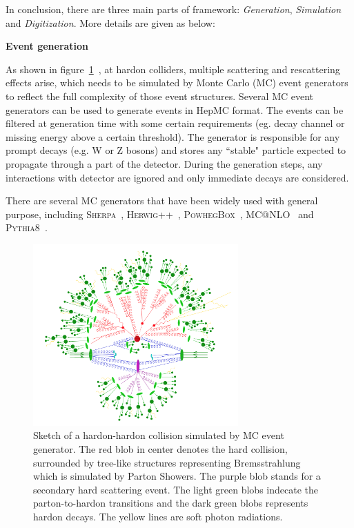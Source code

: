 In conclusion, there are three main parts of framework: \textit{Generation}, \textit{Simulation} and \textit{Digitization}.
More details are given as below:

\textbf{Event generation}

As shown in figure~\ref{fig:mc_event_structure}~\cite{Hoche:2014rga}, at hardon colliders, multiple scattering and rescattering effects arise, which needs to be simulated by Monte Carlo (MC) event generators to reflect the full complexity of those event structures.
Several MC event generators can be used to generate events in HepMC format.
The events can be filtered at generation time with some certain requirements (eg. decay channel or missing energy above a certain threshold).
The generator is responsible for any prompt decays (e.g. W or Z bosons) and stores any ``stable" particle expected to propagate through a part of the detector. 
During the generation steps, any interactions with detector are ignored and only immediate decays are considered.

There are several MC generators that have been widely used with general purpose, including \textsc{Sherpa}~\cite{Gleisberg_2009}, \textsc{Herwig++}~\cite{Bahr2008}, \textsc{PowhegBox}~\cite{Nason:2004rx}, \textsc{MC@NLO}~\cite{Frixione_2002} and \textsc{Pythia8}~\cite{Sjostrand:2007gs}.

\begin{figure}[!htb]
  \centering
  \includegraphics[width=0.7\textwidth]{figures/Simulation/mc_event_structure.png}
  \caption{Sketch of a hardon-hardon collision simulated by MC event generator. The red blob in center denotes the hard collision, surrounded by tree-like structures representing Bremsstrahlung which is simulated by Parton Showers. The purple blob stands for a secondary hard scattering event. The light green blobs indecate the parton-to-hardon transitions and the dark green blobs represents hardon decays. The yellow lines are soft photon radiations.}
  \label{fig:mc_event_structure}
\end{figure}

